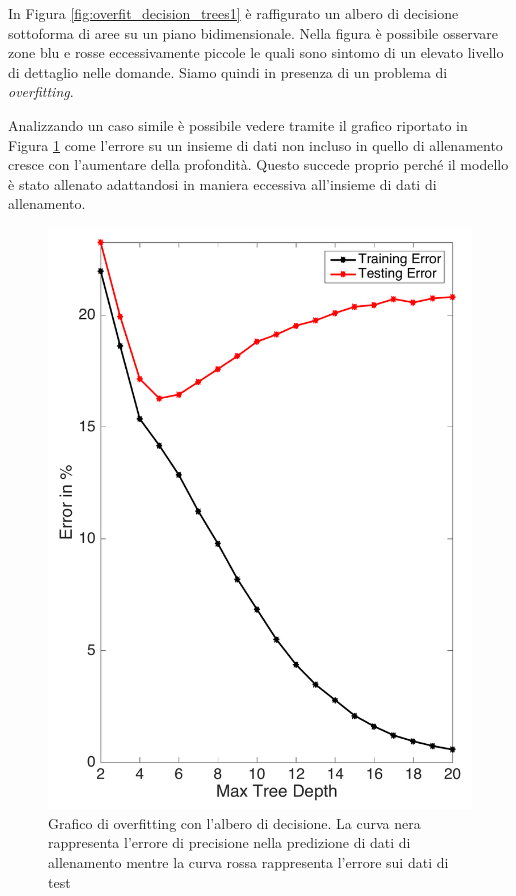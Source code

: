 \documentclass[12pt,italian]{report}
\begin{document}
In Figura \ref{fig:overfit_decision_trees1} è raffigurato un albero di decisione sottoforma di aree su un piano bidimensionale. Nella figura è possibile osservare zone blu e rosse eccessivamente piccole le quali sono sintomo di un elevato livello di dettaglio nelle domande. Siamo quindi in presenza di un problema di \emph{overfitting}.

Analizzando un caso simile è possibile vedere tramite il grafico riportato in Figura \ref{fig:overfit_decision_trees2} come l'errore su un insieme di dati non incluso in quello di allenamento cresce con l'aumentare della profondità. Questo succede proprio perché il modello è stato allenato adattandosi in maniera eccessiva all'insieme di dati di allenamento.
\begin{figure}[h!]
	\center
	\includegraphics[scale=0.18]{../img/overfit_decision_trees2} %
	\caption{Grafico di overfitting con l'albero di decisione. La curva nera rappresenta l'errore di precisione nella predizione di dati di allenamento mentre la curva rossa rappresenta l'errore sui dati di test}
	\label{fig:overfit_decision_trees2}
\end{figure}
\end{document}
